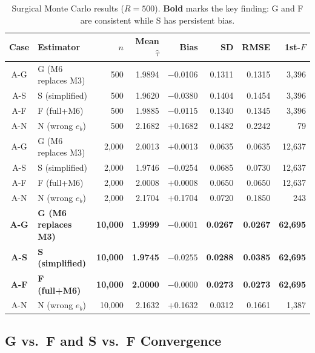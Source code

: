 \documentclass[11pt,letterpaper]{article}
\begin{document}
\begin{table}[H]
\centering
\caption{Surgical Monte Carlo results ($R=500$).
  \textbf{Bold} marks the key finding: G and F are consistent
  while S has persistent bias.}
\label{tab:results-surgical}
\begin{tabular}{clrrrrrr}
\toprule
\textbf{Case} & \textbf{Estimator} & $n$ &
  \textbf{Mean $\hat\tau$} & \textbf{Bias} & \textbf{SD} &
  \textbf{RMSE} & \textbf{1st-$F$} \\
\midrule
A-G & G (M6 replaces M3) &    500 & 1.9894 & $-$0.0106 & 0.1311 & 0.1315 & 3{,}396 \\
A-S & S (simplified) &    500 & 1.9620 & $-$0.0380 & 0.1404 & 0.1454 & 3{,}396 \\
A-F & F (full+M6)    &    500 & 1.9885 & $-$0.0115 & 0.1340 & 0.1345 & 3{,}396 \\
A-N & N (wrong $e_b$)&    500 & 2.1682 & $+$0.1682 & 0.1482 & 0.2242 &      79 \\
\midrule
A-G & G (M6 replaces M3) & 2{,}000 & 2.0013 & $+$0.0013 & 0.0635 & 0.0635 & 12{,}637 \\
A-S & S (simplified) &  2{,}000 & 1.9746 & $-$0.0254 & 0.0685 & 0.0730 & 12{,}637 \\
A-F & F (full+M6)    &  2{,}000 & 2.0008 & $+$0.0008 & 0.0650 & 0.0650 & 12{,}637 \\
A-N & N (wrong $e_b$)&  2{,}000 & 2.1704 & $+$0.1704 & 0.0720 & 0.1850 &     243 \\
\midrule
\textbf{A-G} & \textbf{G (M6 replaces M3)} & \textbf{10{,}000} &
  \textbf{1.9999} & $\boldsymbol{-0.0001}$ & \textbf{0.0267} &
  \textbf{0.0267} & \textbf{62{,}695} \\
\textbf{A-S} & \textbf{S (simplified)} & \textbf{10{,}000} &
  \textbf{1.9745} & $\boldsymbol{-0.0255}$ & \textbf{0.0288} &
  \textbf{0.0385} & \textbf{62{,}695} \\
\textbf{A-F} & \textbf{F (full+M6)} & \textbf{10{,}000} &
  \textbf{2.0000} & $\boldsymbol{-0.0000}$ & \textbf{0.0273} &
  \textbf{0.0273} & \textbf{62{,}695} \\
A-N & N (wrong $e_b$)& 10{,}000 & 2.1632 & $+$0.1632 & 0.0312 & 0.1661 & 1{,}387 \\
\bottomrule
\end{tabular}
\end{table}


\subsection{G vs.\ F and S vs.\ F Convergence}
\end{document}
